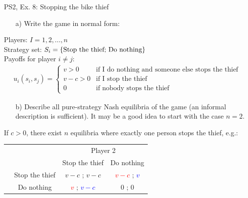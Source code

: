 \begin{frame}{PS2, Ex. 8: Stopping the bike thief}
    \begin{itemize}
      \item[a)] Write the game in normal form:
    \end{itemize}
    Players: $I={1, 2, ..., n}$\\
    Strategy set: $S_i = \{\text{\text{Stop the thief}; Do nothing}\}$\\
    Payoffs for player $i\neq j$: \begin{align*}
      u_i(s_i,s_j)=
      \left\{ \begin{array}{rl}
      v > 0 & \mbox{if I do nothing and someone else stops the thief} \\
      v-c>0 & \mbox{if I stop the thief} \\
      0     & \mbox{if nobody stops the thief}
      \end{array}\right. \end{align*}
    \begin{itemize}
      \item[b)] Describe all pure-strategy Nash equilibria of the game (an informal description is sufficient). It may be a good idea to start with the case $n = 2$.
    \end{itemize}
    If $c>0$, there exist $n$ equilibria where exactly one person stops the thief, e.g.:
    \begin{table}
      \begin{tabular}{cc|c|c|}
        & \multicolumn{1}{c}{} & \multicolumn{2}{c}{\color{blue}Player 2}\\
        \parbox[t]{1mm}{}
        &  &   &  \\
        & Stop the thief & $v-c$ ; $v-c$ & \textcolor{red}{$v-c$} ; \textcolor{blue}{$v$} \\
        & Do nothing & \textcolor{red}{$v$} ; \textcolor{blue}{$v-c$} & 0 ; 0 \\
      \end{tabular}
    \end{table}
\end{frame}



